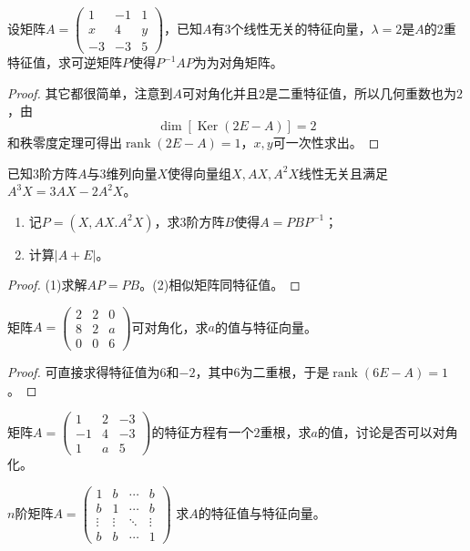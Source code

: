 \begin{theorem}
	设矩阵$A=
	\begin{pmatrix}
		1 & -1 & 1 \\
		x & 4 & y \\
		-3 & -3 & 5
	\end{pmatrix}$，已知$A$有$3$个线性无关的特征向量，$\lambda=2$是$A$的$2$重特征值，求可逆矩阵$P$使得$P^{-1}AP$为为对角矩阵。
\end{theorem}
\begin{proof}
	其它都很简单，注意到$A$可对角化并且$2$是二重特征值，所以几何重数也为$2$，由
	\begin{equation*}
		\dim[\operatorname{Ker}(2E-A)]=2
	\end{equation*}
	和秩零度定理可得出$\operatorname{rank}(2E-A)=1$，$x,y$可一次性求出。
\end{proof}
\begin{theorem}
	已知$3$阶方阵$A$与$3$维列向量$X$使得向量组$X,AX,A^2X$线性无关且满足$A^3X=3AX-2A^2X$。
	\begin{enumerate}
		\item 记$P=(X,AX.A^2X)$，求$3$阶方阵$B$使得$A=PBP^{-1}$；
		\item 计算$|A+E|$。
	\end{enumerate}
\end{theorem}
\begin{proof}
	(1)求解$AP=PB$。(2)相似矩阵同特征值。
\end{proof}
\begin{theorem}
	矩阵$A=
	\begin{pmatrix}
		2 & 2 & 0 \\
		8 & 2 & a \\
		0 & 0 & 6
	\end{pmatrix}$可对角化，求$a$的值与特征向量。
\end{theorem}
\begin{proof}
	可直接求得特征值为$6$和$-2$，其中$6$为二重根，于是$\operatorname{rank}(6E-A)=1$。
\end{proof}

\begin{theorem}
	矩阵$A=
	\begin{pmatrix}
		1 & 2 & -3 \\
		-1 & 4 & -3 \\
		1 & a & 5
	\end{pmatrix}$的特征方程有一个$2$重根，求$a$的值，讨论是否可以对角化。
\end{theorem}

\begin{theorem}
	$n$阶矩阵$A=
	\begin{pmatrix}
		1 & b & \cdots & b \\
		b & 1 & \cdots & b \\
		\vdots & \vdots & \ddots & \vdots \\
		b & b & \cdots & 1
	\end{pmatrix}$
	求$A$的特征值与特征向量。
\end{theorem}

